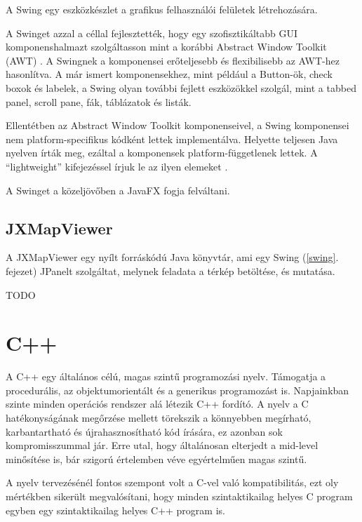 \documentclass[a4paper,12pt]{report}
\begin{document}
A Swing egy eszközkészlet a grafikus felhasználói felületek létrehozására.

\vspace{2mm}
A Swinget azzal a céllal fejlesztették, hogy egy szofisztikáltabb GUI komponenshalmazt szolgáltasson mint a korábbi Abstract Window Toolkit (AWT) \cite{awt}. A Swingnek a komponensei erőteljesebb és flexibilisebb az AWT-hez hasonlítva. A már ismert komponensekhez, mint például a Button-ök, check boxok és labelek, a Swing olyan további fejlett eszközökkel szolgál, mint a tabbed panel, scroll pane, fák, táblázatok és listák.

\vspace{2mm}
Ellentétben az Abstract Window Toolkit komponenseivel, a Swing komponensei nem platform-specifikus kódként lettek implementálva. Helyette teljesen Java nyelven írták meg, ezáltal a komponensek platform-függetlenek lettek. A ``lightweight'' kifejezéssel írjuk le az ilyen elemeket \cite{swingarticle}.

\vspace{2mm}
A Swinget a közeljövőben a JavaFX \cite{javafx} fogja felváltani.

\subsection{JXMapViewer}
\label{jxmapviewer}

A JXMapViewer \cite{jxmapv} egy nyílt forráskódú Java könyvtár, ami egy Swing (\ref{swing}. fejezet) JPanelt \cite{jpanel} szolgáltat, melynek feladata a térkép betöltése, és mutatása.

\vspace{2mm}
TODO

\newpage
\section{C++}
\label{cplusplus}

A C++ egy általános célú, magas szintű programozási nyelv. Támogatja a procedurális, az objektumorientált és a generikus programozást is. Napjainkban szinte minden operációs rendszer alá létezik C++ fordító. A nyelv a C hatékonyságának megőrzése mellett törekszik a könnyebben megírható, karbantartható és újrahasznosítható kód írására, ez azonban sok kompromisszummal jár. Erre utal, hogy általánosan elterjedt a mid-level minősítése is, bár szigorú értelemben véve egyértelműen magas szintű.

\vspace{2mm}
A nyelv tervezésénél fontos szempont volt a C-vel való kompatibilitás, ezt oly mértékben sikerült megvalósítani, hogy minden szintaktikailag helyes C program egyben egy szintaktikailag helyes C++ program is. 
\end{document}
